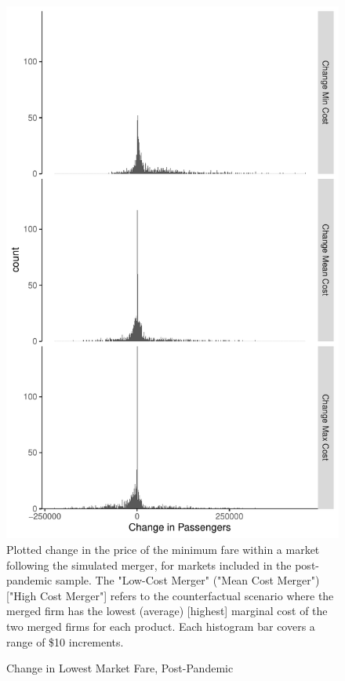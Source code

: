 \documentclass{article}
\begin{document}
\begin{appendices}
	\begin{figure}
		\caption{Change in Lowest Market Fare, Post-Pandemic}
		\label{fig:LowestMarketChange_Post}
		\includegraphics[width = \linewidth]{Merger_Change_MinimumFare}
		\footnotesize{Plotted change in the price of the minimum fare within a market following the simulated merger, for markets included in the post-pandemic sample. The "Low-Cost Merger" ("Mean Cost Merger") ["High Cost Merger"] refers to the counterfactual scenario where the merged firm has the lowest (average) [highest] marginal cost of the two merged firms for each product. Each histogram bar covers a range of \$10 increments.}
	\end{figure}
	

\end{appendices}
\end{document}
